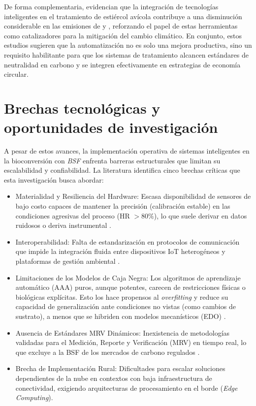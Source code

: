 De forma complementaria, \textcite{jenkinsProcessingPoultryManure2025} evidencian que la integración de tecnologías inteligentes en el tratamiento de estiércol avícola contribuye a una disminución considerable en las emisiones de  y , reforzando el papel de estas herramientas como catalizadores para la mitigación del cambio climático. En conjunto, estos estudios sugieren que la automatización no es solo una mejora productiva, sino un requisito habilitante para que los sistemas de tratamiento alcancen estándares de neutralidad en carbono y se integren efectivamente en estrategias de economía circular.

\section{Brechas tecnológicas y oportunidades de investigación}


A pesar de estos avances, la implementación operativa de sistemas inteligentes en la bioconversión con \textit{BSF} enfrenta barreras estructurales que limitan su escalabilidad y confiabilidad. La literatura identifica cinco brechas críticas que esta investigación busca abordar:
\begin{itemize}
\item Materialidad y Resiliencia del Hardware: Escasa disponibilidad de sensores de bajo costo capaces de mantener la precisión (calibración estable) en las condiciones agresivas del proceso (HR $>80\%$), lo que suele derivar en datos ruidosos o deriva instrumental \parencite{AgricultureClimateChangea}.

\item Interoperabilidad: Falta de estandarización en protocolos de comunicación que impide la integración fluida entre dispositivos IoT heterogéneos y plataformas de gestión ambiental \parencite{vanIntegrationInternetofThingsSustainable2022a}.

\item Limitaciones de los Modelos de Caja Negra: Los algoritmos de aprendizaje automático (AAA) puros, aunque potentes, carecen de restricciones físicas o biológicas explícitas. Esto los hace propensos al \textit{overfitting} y reduce su capacidad de generalización ante condiciones no vistas (como cambios de sustrato), a menos que se hibriden con modelos mecanísticos (EDO) \parencite{weichertReviewMachineLearning2019}.

\item Ausencia de Estándares MRV Dinámicos: Inexistencia de metodologías validadas para el Medición, Reporte y Verificación (MRV) en tiempo real, lo que excluye a la BSF de los mercados de carbono regulados \parencite{herrinCollateralDataQualitya}.

\item Brecha de Implementación Rural: Dificultades para escalar soluciones dependientes de la nube en contextos con baja infraestructura de conectividad, exigiendo arquitecturas de procesamiento en el borde (\textit{Edge Computing}).
\end{itemize}

